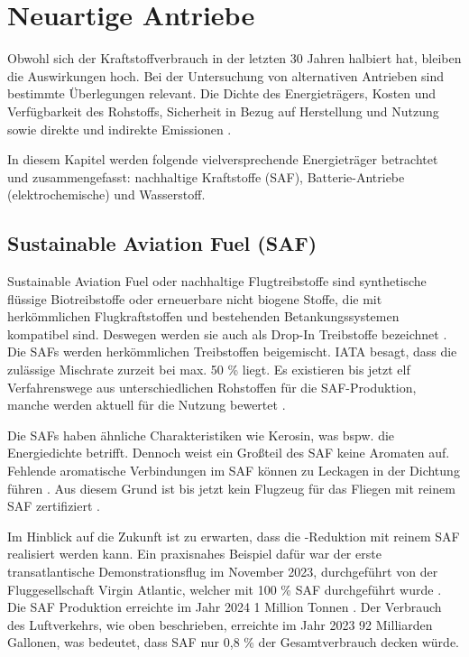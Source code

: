 
\section{Neuartige Antriebe}
\label{s:Neuartige Antriebe}
Obwohl sich der Kraftstoffverbrauch in der letzten 30 Jahren halbiert \cite{mensen2013handbuch} hat, bleiben die Auswirkungen hoch.
Bei der Untersuchung von alternativen Antrieben sind bestimmte Überlegungen relevant. 
Die Dichte des Energieträgers, Kosten und Verfügbarkeit des Rohstoffs, Sicherheit in Bezug auf Herstellung 
und Nutzung sowie direkte und indirekte  Emissionen \cite{ansell2023review}.

In diesem Kapitel werden folgende vielversprechende Energieträger betrachtet und zusammengefasst: 
nachhaltige Kraftstoffe (SAF), Batterie-Antriebe (elektrochemische) und Wasserstoff.

\subsection{Sustainable Aviation Fuel (SAF)}

Sustainable Aviation Fuel oder nachhaltige Flugtreibstoffe sind synthetische flüssige Biotreibstoffe oder erneuerbare nicht biogene Stoffe, %
die mit herkömmlichen Flugkraftstoffen und bestehenden Betankungssystemen kompatibel sind.
Deswegen werden sie auch als Drop-In Treibstoffe bezeichnet \cite{iata_saf_2024}. 
Die SAFs werden herkömmlichen Treibstoffen beigemischt. IATA besagt, dass die zulässige Mischrate 
zurzeit bei max. 50 \% liegt. Es existieren bis jetzt elf Verfahrenswege aus unterschiedlichen Rohstoffen für die SAF-Produktion,
manche werden aktuell für die Nutzung bewertet \cite{icao_saf_conversion_2024}.

Die SAFs haben ähnliche Charakteristiken wie Kerosin, was bspw. die Energiedichte betrifft. 
Dennoch weist ein Großteil des SAF keine Aromaten auf.
Fehlende aromatische Verbindungen im SAF können zu Leckagen in der Dichtung führen \cite{jarin2024emissions}. 
Aus diesem Grund ist bis jetzt kein Flugzeug für das Fliegen mit reinem SAF zertifiziert \cite{iata_saf_2024}.

Im Hinblick auf die Zukunft ist zu erwarten, dass die -Reduktion mit reinem SAF realisiert werden kann.
Ein praxisnahes Beispiel dafür war der erste transatlantische Demonstrationsflug im November 2023, 
durchgeführt von der Fluggesellschaft Virgin Atlantic, welcher mit 100 \% SAF durchgeführt wurde \cite{virginatlantic_saf_2023}. 
Die SAF Produktion erreichte im Jahr 2024 1 Million Tonnen \cite{iata2024}. 
Der Verbrauch des Luftverkehrs, wie oben beschrieben, erreichte im Jahr 2023 92 Milliarden Gallonen, 
was bedeutet, dass SAF nur 0,8 \% der Gesamtverbrauch decken würde.

